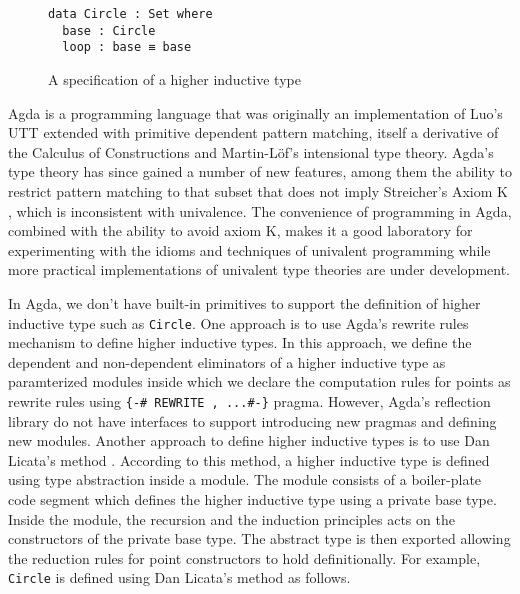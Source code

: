 \documentclass[sigplan,10pt]{acmart}
\begin{document}
\begin{figure}[h]
\begin{center}
\begin{BVerbatim}
data Circle : Set where
  base : Circle
  loop : base ≡ base
\end{BVerbatim}
\end{center}
\caption{A specification of a higher inductive type}
\label{fig:circle}
\end{figure}


Agda  is a programming language that was originally an implementation of Luo's UTT  extended with primitive dependent pattern matching, itself a derivative of the Calculus of Constructions and Martin-Löf's intensional type theory.
Agda's type theory has since gained a number of new features, among them the ability to restrict pattern matching to that subset that does not imply Streicher's Axiom K , which is inconsistent with univalence.
The convenience of programming in Agda, combined with the ability to avoid axiom K, makes it a good laboratory for experimenting with the idioms and techniques of univalent programming while more practical implementations of univalent type theories are under development.

In Agda, we don't have built-in primitives to support the definition of higher inductive type such as {\tt Circle}. One approach is to use Agda's rewrite rules  mechanism to define higher inductive types. In this approach, we define the dependent and non-dependent eliminators of a higher inductive type as paramterized modules inside which we declare the computation rules for points as rewrite rules using \Verb|{-# REWRITE , ...#-}| pragma. However, Agda's reflection library do not have interfaces to support introducing new pragmas and defining new modules. Another approach to define higher inductive types is to use Dan Licata's method \cite{Licata-2011}. According to this method, a higher inductive type is defined using type abstraction inside a module. The module consists of a boiler-plate code segment which defines the higher inductive type using a private base type. Inside the module, the recursion and the induction principles acts on the constructors of the private base type. The abstract type is then exported allowing the reduction rules for point constructors to hold definitionally. For example, {\tt Circle} is defined using Dan Licata's method as follows.
\end{document}
